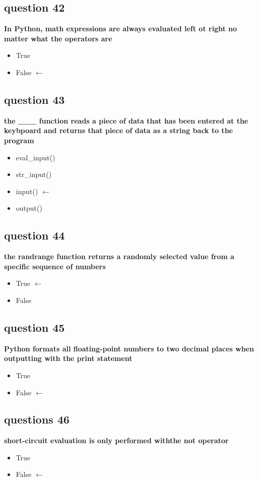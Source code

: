 \documentclass[10pt]{article}
\begin{document}
\subsection*{question 42}
\textbf{In Python, math expressions are always evaluated left ot right no matter what the operators are}
\begin{itemize}
\item True
\item False $\leftarrow$
\end{itemize}
\subsection*{question 43}
\textbf{the \_\_\_  function reads a piece of data that has been entered at the keybpoard and returns that piece of data as a string back to the program}
\begin{itemize}
\item eval\_input()
\item str\_input()
\item input() $\leftarrow$
\item output()
\end{itemize}
\subsection*{question 44}
\textbf{the randrange function returns a randomly selected value from a specific sequence of numbers}
\begin{itemize}
\item True $\leftarrow$ 
\item False
\end{itemize}
\subsection*{question 45}
\textbf{Python formats all floating-point numbers to two decimal places when outputting with the print statement}
\begin{itemize}
\item True
\item False $\leftarrow$
\end{itemize}
\subsection*{questions 46}
\textbf{short-circuit evaluation is only performed withthe not operator}
\begin{itemize}
\item True
\item False $\leftarrow$
\end{itemize}
\end{document}
